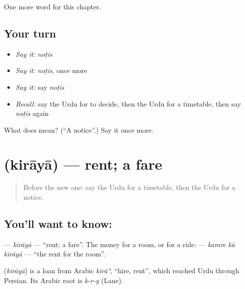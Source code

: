 \begin{grammarlens}[title={What you've built}]
One more word for this chapter.
\end{grammarlens}

\subsection*{Your turn}
\begin{itemize}
\raggedright
  \item \emph{Say it:} \emph{noṭis}
  \item \emph{Say it:} \emph{noṭis}, once more
  \item \emph{Say it:} say \emph{noṭis}
  \item \emph{Recall:} say the Urdu for to decide, then the Urdu for a timetable, then say \emph{noṭis} again
\end{itemize}

\begin{tcolorbox}[breakable,colback=teal!4,colframe=teal!35!black,title={Before you move on}]
What does  mean? (\textquotedblleft{}A notice\textquotedblright{}.) Say it once more.
\end{tcolorbox}
\section[\texorpdfstring{\ur{کرایہ} (kirāyā)}{کرایہ (kirāyā)}]{ (kirāyā) — rent; a fare}

\label{lesson:UR-C146-kiraya}



\begin{quote}
Before the new one: say the Urdu for a timetable, then the Urdu for a notice.
\end{quote}

\subsection*{You'll want to know: }
\textbf{} — \emph{kirāyā} — \textquotedblleft{}rent; a fare\textquotedblright{}. The money for a room, or for a ride: \textbf{  } — \emph{kamre kā kirāyā} — \textquotedblleft{}the rent for the room\textquotedblright{}.

\begin{cousinweb}
\textbf{} (\emph{kirāyā}) is a loan from Arabic \emph{kirāʾ}, \textquotedblleft{}hire, rent\textquotedblright{}, which reached Urdu through Persian. Its Arabic root is \emph{k-r-y} (Lane).
\end{cousinweb}

